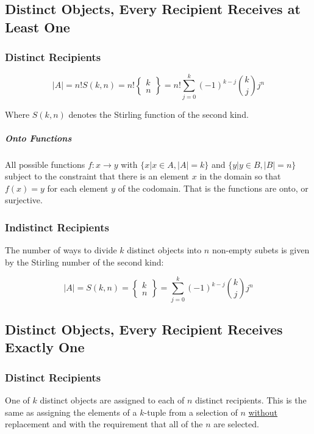 \subsection{Distinct Objects, Every Recipient Receives at Least One}

\subsubsection{Distinct Recipients}

\begin{equation}
|A| = n!S(k,n) =n! \left\{ \begin{array}{c} k \\n \end{array}\right\} = n! \sum_{j=0}^k (-1)^{k-j} {k \choose j }j^n
\end{equation}

Where $S(k,n)$	 denotes the Stirling function of the second kind.

\subparagraph{Onto Functions} All possible functions $f:x \rightarrow y$ with $\{x | x\in A, |A| = k \}$ and $\{y | y\in B, |B| = n\}$ subject to the constraint that there is an element $x$ in the domain so that $f(x)=y$ for each element $y$ of the codomain. That is the functions are onto, or surjective.


\subsubsection{Indistinct Recipients}
The number of ways to divide $k$ distinct objects into $n$ non-empty subets is given by the Stirling number of the second kind:

\begin{equation}
|A| = S(k,n) = \left\{ \begin{array}{c} k \\n \end{array} \right\} = \sum_{j=0}^k (-1)^{k-j} {k \choose j }j^n
\end{equation}


\subsection{Distinct Objects, Every Recipient Receives Exactly One}

\subsubsection{Distinct Recipients}
One of $k$ distinct objects are assigned to each of $n$ distinct recipients. This is the same as assigning the elements of a $k$-tuple from a selection of $n$ \underline{without} replacement and with the requirement that all of the $n$ are selected.

